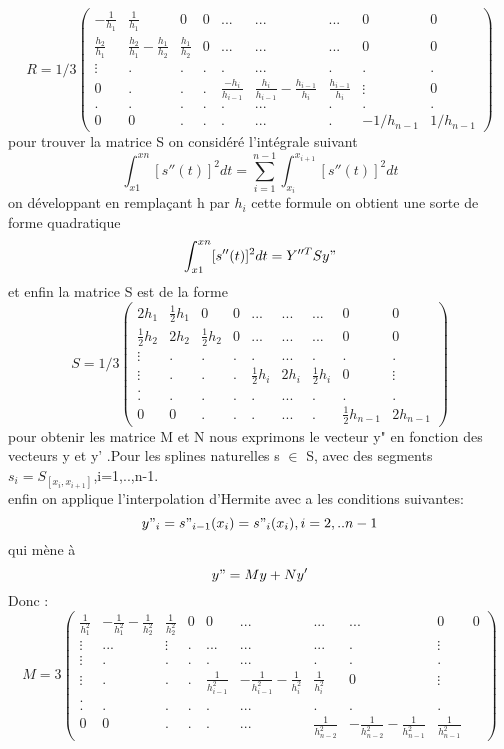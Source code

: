 \documentclass[a4paper,12pt]{article} %
\begin{document}
                $$R=1/3\begin{pmatrix} -\frac{1}{h_1}&\frac{1}{h_1}&0&0&...&...&...&0&0 \\ \frac{h_2}{h_1}&\frac{h_2}{h_1}-\frac{h_1}{h_2}&\frac{h_1}{h_2}&0&...&...&...&0&0 \\ \vdots&.&.&.&.&...&.&.&.\\ 0&.&.&.&\frac{-h_i}{h_{i-1}}&\frac{h_i}{h_{i-1}}-\frac{h_{i-1}}{h_i}&\frac{h_{i-1}}{h_i}&\vdots&0 \\.&.&.&.&.&...&.&.&. \\ 0&0&.&.&.&...&.&-1/h_{n-1}&1/h_{n-1} \end{pmatrix}$$\newpage
                pour trouver la matrice S on considéré  l'intégrale suivant \\
                $$\int_{x1}^{xn}[s''(t)]^2dt=\sum_{i=1}^{n-1}\int_{x_i}^{x_{i+1}}[s''(t)]^2dt$$
                on développant en remplaçant h par $h_i$   cette formule on obtient une sorte de forme quadratique  $$\int_{x1}^{xn}[s''(t)]^2dt= Y''^T S y"$$
                et enfin la matrice S est de la forme 
                $$S=1/3\begin{pmatrix} 2h_1&\frac{1}{2}h_1&0&0&...&...&...&0&0 \\ \frac{1}{2}h_2&2h_2&\frac{1}{2}h_2&0&...&...&...&0&0 \\ \vdots&.&.&.&.&...&.&.&.\\ \vdots&.&.&.&\frac{1}{2}h_i&2h_i&\frac{1}{2}h_i&0&\vdots \\. \\.&.&.&.&.&...&.&.&. \\ 0&0&.&.&.&...&.&\frac{1}{2}h_{n-1}&2h_{n-1} \end{pmatrix}$$
                pour obtenir les matrice M et N nous exprimons le vecteur y" en fonction des  vecteurs y et y' .Pour les splines naturelles s $\in$ S, avec des segments $s_i=S_{[x_i,x_{i+1}]}$,i=1,..,n-1.\\
                enfin on applique l'interpolation d'Hermite avec a les conditions suivantes:$$y"_i=s"_{i-1}(x_i)=s"_i(x_i) ,i=2,..n-1$$
                qui mène à $$y"=My+Ny'$$ Donc :
                $$M=3\begin{pmatrix} \frac{1}{h_1^2}&-\frac{1}{h_1^2}-\frac{1}{h_2^2}&\frac{1}{h_2^2}&0&0&...&...&...&0&0 \\ \vdots&...&\vdots&.&...&...&...&.&\vdots \\ \vdots&.&.&.&.&...&.&.&.\\ \vdots&.&.&.&\frac{1}{h_{i-1}^2}&-\frac{1}{h_{i-1}^2}-\frac{1}{h_i^2}&\frac{1}{h_i^2}&0&\vdots \\. \\.&.&.&.&.&...&.&.&. \\ 0&0&.&.&.&...&\frac{1}{h_{n-2}^2}&-\frac{1}{h_{n-2}^2}-\frac{1}{h_{n-1}^2}&\frac{1}{h_{n-1}^2} \end{pmatrix}$$
\end{document}
